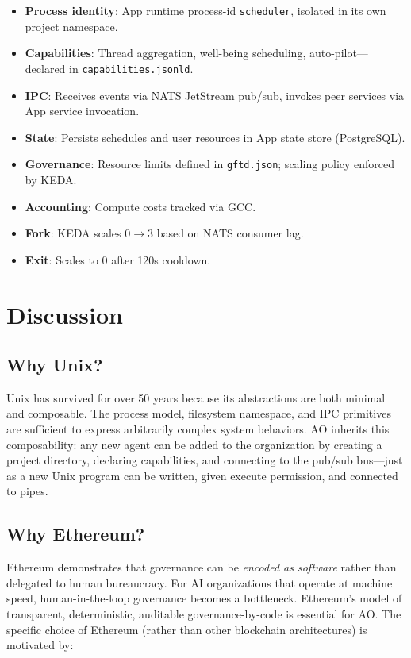\documentclass[11pt,a4paper]{article}
\begin{document}
\begin{itemize}[nosep]
  \item \textbf{Process identity}: App runtime process-id \texttt{scheduler}, isolated
    in its own project namespace.
  \item \textbf{Capabilities}: Thread aggregation, well-being scheduling,
    auto-pilot---declared in \texttt{capabilities.jsonld}.
  \item \textbf{IPC}: Receives events via NATS JetStream pub/sub, invokes
    peer services via App service invocation.
  \item \textbf{State}: Persists schedules and user resources in App state
    store (PostgreSQL).
  \item \textbf{Governance}: Resource limits defined in
    \texttt{gftd.json}; scaling policy enforced by KEDA.
  \item \textbf{Accounting}: Compute costs tracked via GCC.
  \item \textbf{Fork}: KEDA scales 0$\rightarrow$3 based on NATS consumer lag.
  \item \textbf{Exit}: Scales to 0 after 120s cooldown.
\end{itemize}

\section{Discussion}

\subsection{Why Unix?}

Unix has survived for over 50 years because its abstractions are both minimal
and composable. The process model, filesystem namespace, and IPC primitives
are sufficient to express arbitrarily complex system behaviors. AO inherits
this composability: any new agent can be added to the organization by
creating a project directory, declaring capabilities, and connecting to the
pub/sub bus---just as a new Unix program can be written, given execute
permission, and connected to pipes.

\subsection{Why Ethereum?}

Ethereum demonstrates that governance can be \emph{encoded as software}
rather than delegated to human bureaucracy. For AI organizations that
operate at machine speed, human-in-the-loop governance becomes a
bottleneck. Ethereum's model of transparent, deterministic, auditable
governance-by-code is essential for AO. The specific choice of Ethereum
(rather than other blockchain architectures) is motivated by:
\end{document}

